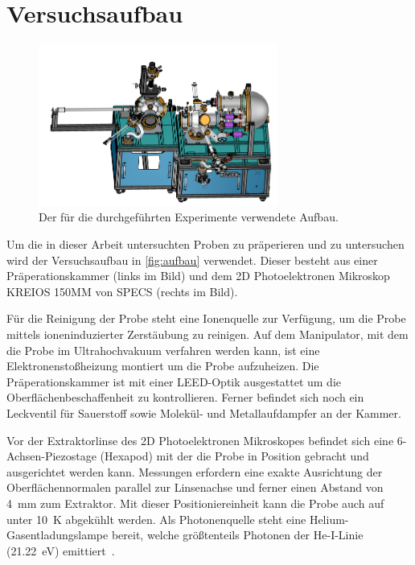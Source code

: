     \section{Versuchsaufbau}
    \label{sec:Versuchsaufbau}
        \begin{figure}
            \centering
            \includegraphics[width=0.7\textwidth]{MM.png}
            \caption{Der für die durchgeführten Experimente verwendete Aufbau.}
            \label{fig:aufbau}
        \end{figure}
        Um die in dieser Arbeit untersuchten Proben zu präperieren und zu untersuchen wird der Versuchsaufbau in \autoref{fig:aufbau} verwendet.
        Dieser besteht aus einer Präperationskammer (links im Bild) und dem 2D Photoelektronen Mikroskop KREIOS 150MM von SPECS (rechts im Bild).

        Für die Reinigung der Probe steht eine Ionenquelle zur Verfügung, um die Probe mittels ioneninduzierter Zerstäubung zu reinigen.
        Auf dem Manipulator, mit dem die Probe im Ultrahochvakuum verfahren werden kann, ist eine Elektronenstoßheizung montiert um die Probe aufzuheizen.
        Die Präperationskammer ist mit einer LEED-Optik ausgestattet um die Oberflächenbeschaffenheit zu kontrollieren.
        Ferner befindet sich noch ein Leckventil für Sauerstoff sowie Molekül- und Metallaufdampfer an der Kammer.
        
        Vor der Extraktorlinse des 2D Photoelektronen Mikroskopes befindet sich eine 6-Achsen-Piezostage (Hexapod) mit der die Probe in Position gebracht und ausgerichtet werden kann.
        Messungen erfordern eine exakte Ausrichtung der Oberflächennormalen parallel zur Linsenachse und ferner einen Abstand von \SI{4}{\milli\meter} zum Extraktor.
        Mit dieser Positioniereinheit kann die Probe auch auf unter \SI{10}{\kelvin} abgekühlt werden.
        Als Photonenquelle steht eine Helium-Gasentladungslampe bereit, welche größtenteils Photonen der He-I-Linie (\SI{21.22}{\electronvolt}) emittiert~\cite{UVS}.